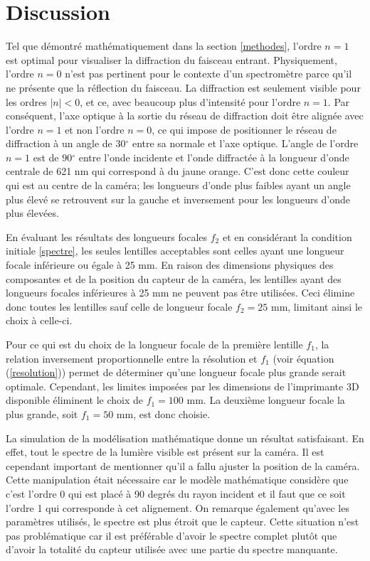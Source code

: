 \documentclass[conference]{IEEEtran}
\begin{document}
\section{Discussion}
Tel que démontré mathématiquement dans la section \ref{methodes}, l'ordre $n=1$ est optimal pour visualiser la diffraction
du faisceau entrant. Physiquement, l'ordre $n=0$ n'est pas pertinent pour le contexte d'un spectromètre parce qu'il ne présente que 
la réflection du faisceau. La diffraction est seulement visible pour les ordres $|n|<0$, et ce, avec beaucoup plus d'intensité pour l'ordre $n=1$.
Par conséquent, l'axe optique à la sortie du réseau de diffraction doit être alignée avec l'ordre $n=1$ et non l'ordre $n=0$, ce qui impose
de positionner le réseau de diffraction à un angle de $30{^\circ}$ entre sa normale et l'axe optique. L'angle de l'ordre $n=1$ est de $90{^\circ}$ entre 
l'onde incidente et l'onde diffractée à la longueur d'onde centrale de 621 nm qui correspond à du jaune orange.
C'est donc cette couleur qui est au centre de la caméra; les longueurs d'onde plus faibles ayant un angle  
plus élevé se retrouvent sur la gauche et inversement pour les longueurs d'onde plus élevées.

En évaluant les résultats des longueurs focales $f_2$ et en considérant la condition initiale \ref{spectre}, les seules lentilles acceptables sont celles
ayant une longueur focale inférieure ou égale à 25 mm. En raison des dimensions physiques des composantes et de
la position du capteur de la caméra, les lentilles ayant des longueurs focales inférieures à 25 mm ne peuvent pas être utilisées.
Ceci élimine donc toutes les lentilles sauf celle de longueur focale $f_2=25$ mm, limitant ainsi le choix à celle-ci.

Pour ce qui est du choix de la longueur focale de la première lentille $f_1$, la relation inversement proportionnelle
entre la résolution et $f_1$ (voir équation (\ref{resolution})) permet de déterminer qu'une longueur focale plus grande serait optimale. Cependant,
les limites imposées par les dimensions de l'imprimante 3D disponible éliminent le choix de $f_1=100$ mm. La deuxième longueur focale la plus grande, soit $f_1=50$ mm,
est donc choisie.

La simulation de la modélisation mathématique donne un résultat satisfaisant. En effet, tout le spectre
de la lumière visible est présent sur la caméra. Il est cependant important de mentionner qu'il a fallu ajuster la
position de la caméra. Cette manipulation était nécessaire car le modèle mathématique considère que c'est l'ordre 0 qui est placé à 90 degrés du rayon
incident et il faut que ce soit l'ordre 1 qui corresponde à cet alignement. On remarque également qu'avec les paramètres utilisés, le spectre est plus étroit
que le capteur. Cette situation n'est pas problématique car il est préférable d'avoir le spectre complet plutôt que d'avoir la totalité du capteur utilisée
avec une partie du spectre manquante.
\end{document}
